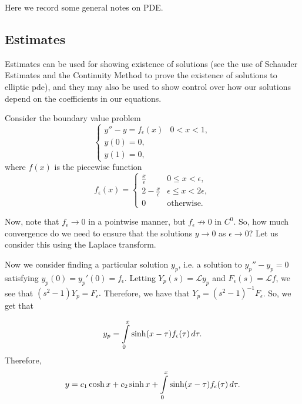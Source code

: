 Here we record some general notes on PDE.

\subsection{Estimates}

Estimates can be used for showing existence of solutions (see the use of Schauder Estimates and the Continuity Method to prove the existence of solutions to elliptic pde), and they may also be used to show control over how our solutions depend on the coefficients in our equations.

\begin{example}
Consider the boundary value problem
\begin{equation}
\begin{cases}
y'' - y = f_\epsilon(x) & 0<x<1,\\
y(0) = 0,\\
y(1) = 0,
\end{cases}
\end{equation}
where $f(x)$ is the piecewise function
\begin{equation}
f_\epsilon(x) = 
\begin{cases}
\frac{x}{\epsilon} & 0 \leq x < \epsilon,\\
2 - \frac{x}{\epsilon} & \epsilon \leq x < 2\epsilon,\\
0 & \text{otherwise}.
\end{cases}
\end{equation}

Now, note that $f_\epsilon \to 0$ in a pointwise manner, but $f_\epsilon \not \to 0$ in $C^0$. So, how much convergence do we need to ensure that the solutions $y \to 0$ as $\epsilon \to 0$? Let us consider this using the Laplace transform.

Now we consider finding a particular solution $y_p$, i.e. a solution to $y_p'' - y_p=0$ satisfying $y_p(0) = y_p'(0) = f_\epsilon$. Letting $Y_p(s) = \mathcal L y_p$ and $F_\epsilon(s) = \mathcal L f$, we see that $(s^2 - 1)Y_p = F_\epsilon.$ Therefore, we have that $Y_p = (s^2 - 1)^{-1} F_\epsilon$. So, we get that

\begin{equation}
y_p = \int\limits_0^x \sinh(x - \tau) f_\epsilon(\tau) \, d\tau.
\end{equation}
Therefore,
\begin{equation}
y = c_1 \cosh x + c_2 \sinh x + \int\limits_0^x \sinh(x-\tau)f_\epsilon(\tau) \, d\tau.
\end{equation}


\end{example}
